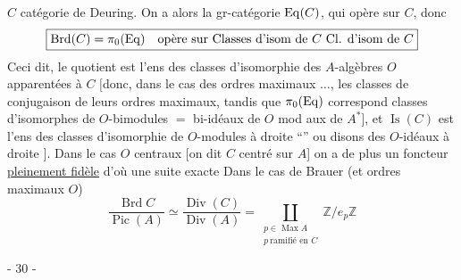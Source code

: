 $C$ catégorie de Deuring. On a alors la gr-catégorie
$\operatorname{Eq}(C)$, qui opère sur $C$, donc
\[
\boxed{\operatorname{Brd}(C)=\pi_0(\operatorname{Eq})
\quad\text{opère sur }\text{Classes d'isom de }C
\ \text{Cl. d'isom de }C}
\]
Ceci dit, le quotient est l'ens des classes d'isomorphie des $A$-algèbres $O$ apparentées à $C$
$[$donc, dans le cas des  ordres maximaux $\ldots$,
les classes de conjugaison de leurs ordres maximaux,
tandis que $\pi_0(\operatorname{Eq})$ correspond 
 classes d'isomorphes de $O$-bimodules
$=$ bi-idéaux de $O$ mod aux  de  $A^*$],
 et $\operatorname{Is}(C)$ est l'ens des classes d'isomorphie de $O$-modules à droite ``''  ou disons des $O$-idéaux \unsure{$*$} à droite $]$.
Dans le cas  $O$ centraux
$[$on dit $C$ centré sur $A$] on a de plus un foncteur \uline{pleinement fidèle}
d'où une suite exacte
Dans le cas de Brauer (et ordres maximaux $O$)
\[
\frac{\operatorname{Brd}C}{\operatorname{Pic}(A)}
\simeq\frac{\operatorname{Div}(C)}{\operatorname{Div}(A)}
=\coprod_{\substack{p\in\operatorname{Max}A\\p\ \text{ramifié en }C}}
\mathbb Z/e_p\mathbb Z
\]


\begin{center}- 30 -\end{center}

